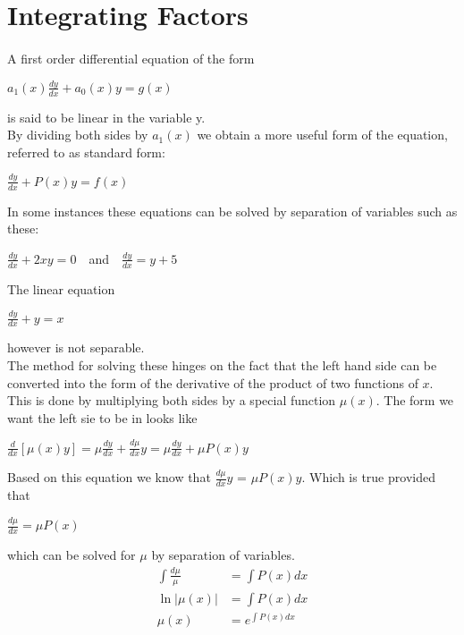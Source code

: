 \documentclass{report}
\begin{document}
    \section{Integrating Factors}
    \paragraph{}A first order differential equation of the form 
    \begin{center}
        \(a_1(x)\frac{dy}{dx}+a_0(x)y=g(x)\)
    \end{center}
    is said to be linear in the variable y.\\

    By dividing both sides by \(a_1(x)\) we obtain a more useful form of the equation, referred to as standard form:
    \begin{center}
        \(\frac{dy}{dx}+P(x)y=f(x)\)
    \end{center}

    In some instances these equations can be solved by separation of variables such as these:
    \begin{center}
        \(\frac{dy}{dx}+2xy=0\) \,\, and \,\, \(\frac{dy}{dx}=y+5\)
    \end{center}
    The linear equation 
    \begin{center}
        \(\frac{dy}{dx}+y=x\)
    \end{center}
    however is not separable.\\

    The method for solving these hinges on the fact that the left hand side can be converted into the form of the derivative of the product of two functions of \(x\). This 
    is done by multiplying both sides by a special function \(\mu (x)\). The form we want the left sie to be in looks like
    \begin{center}
        \(\frac{d}{dx}[\mu(x)y] = \mu\frac{dy}{dx}+\frac{d\mu}{dx}y=\mu\frac{dy}{dx}+\mu P(x)y\)
    \end{center}
    Based on this equation we know that \(\frac{d\mu}{dx}y\) = \(\mu P(x)y\). Which is true provided that 
    \begin{center}
        \(\frac{d\mu}{dx}=\mu P(x)\)
    \end{center}
    which can be solved for \(\mu\) by separation of variables.
    \begin{align*}
        \int\frac{d\mu}{\mu}&=\int P(x)dx\\
        \ln|\mu(x)|&=\int P(x) dx\\
        \mu(x) &= e^{\int P(x) dx} 
    \end{align*}
\end{document}
